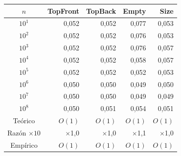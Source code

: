\begin{tabular}{crrrr}
\toprule
$n$ & \textbf{TopFront} & \textbf{TopBack} & \textbf{Empty} & \textbf{Size} \\
\midrule
$10^{1}$ & 0{,}052 & 0{,}052 & 0{,}077 & 0{,}053 \\
$10^{2}$ & 0{,}052 & 0{,}052 & 0{,}076 & 0{,}053 \\
$10^{3}$ & 0{,}052 & 0{,}052 & 0{,}076 & 0{,}057 \\
$10^{4}$ & 0{,}052 & 0{,}052 & 0{,}058 & 0{,}057 \\
$10^{5}$ & 0{,}052 & 0{,}052 & 0{,}052 & 0{,}053 \\
$10^{6}$ & 0{,}050 & 0{,}050 & 0{,}049 & 0{,}050 \\
$10^{7}$ & 0{,}050 & 0{,}050 & 0{,}049 & 0{,}049 \\
$10^{8}$ & 0{,}050 & 0{,}051 & 0{,}054 & 0{,}051 \\
\midrule
Teórico & $O(1)$ & $O(1)$ & $O(1)$ & $O(1)$ \\
Razón $\times 10$ & $\times$1{,}0 & $\times$1{,}0 & $\times$1{,}1 & $\times$1{,}0 \\
Empírico & $O(1)$ & $O(1)$ & $O(1)$ & $O(1)$ \\
\bottomrule
\end{tabular}